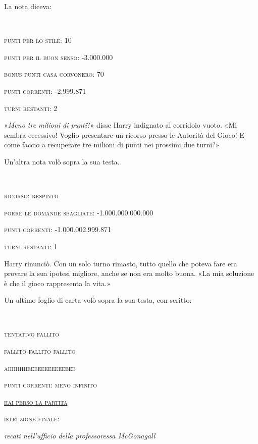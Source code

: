 La nota diceva:

\begin{addmargin}[3em]{3em}%
~

\textsc{punti per lo stile: 10}

\textsc{punti per il buon senso: -3.000.000}

\textsc{bonus punti casa corvonero: 70}

\textsc{punti correnti: -2.999.871}

\textsc{turni restanti: 2}\\
\end{addmargin}

«\textit{Meno tre milioni di punti}?» disse Harry indignato al corridoio vuoto. «Mi sembra eccessivo! Voglio presentare un ricorso presso le Autorità del Gioco! E come faccio a recuperare tre milioni di punti nei prossimi due turni?»

Un’altra nota volò sopra la sua testa.

\begin{addmargin}[3em]{3em}%
~

\textsc{ricorso: respinto}

\textsc{porre le domande sbagliate: -1.000.000.000.000}

\textsc{punti correnti: -1.000.002.999.871}

\textsc{turni restanti: 1}\\
\end{addmargin}

Harry rinunciò. Con un solo turno rimasto, tutto quello che poteva fare era provare la sua ipotesi migliore, anche se non era molto buona. «La mia soluzione è che il gioco rappresenta la vita.»

Un ultimo foglio di carta volò sopra la sua testa, con scritto:

\begin{addmargin}[3em]{3em}%
\begin{center}
~

\textsc{tentativo fallito}

\textsc{fallito fallito fallito}

\textsc{aiiiiiiiiiieeeeeeeeeeeeee}

\textsc{punti correnti: meno infinito}

\textsc{\underline{hai perso la partita}}

\textsc{istruzione finale:}

\textit{recati nell’ufficio della professoressa McGonagall}\\
\end{center}
\end{addmargin}

